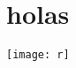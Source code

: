 \documentclass[12pt,letter]{article}
\begin{document}
\section{holas}
\begin{center}
\texttt{[image: r]} 
\end{center}
\end{document}
